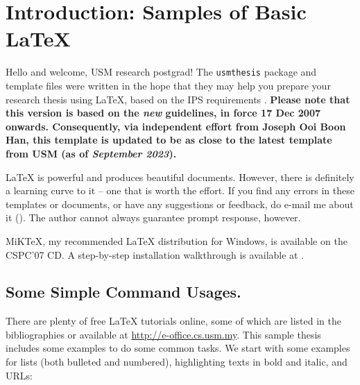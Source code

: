 \chapter{Introduction: Samples of Basic \LaTeX{}}\label{chap:intro}

Hello and welcome, \ac{USM} research postgrad!  The \verb|usmthesis| package and template files were written in the hope that they may help you prepare your research thesis using \LaTeX, based on the \ac{IPS} requirements \citep{ips:thesis:guideline:2007}. \textbf{Please note that this version is based on the \emph{new} guidelines, in force 17 Dec 2007 onwards. Consequently, via independent effort from Joseph Ooi Boon Han, this template is updated to be as close to the latest template from USM (as of \emph{September 2023}).}

\LaTeX{} is powerful and produces beautiful documents.  However, there is definitely a learning curve to it -- one that is worth the effort.  %
If you find any errors in these templates or documents, or have any suggestions or feedback, do e-mail me about it ().  The author cannot always guarantee prompt response, however. \Smiley

MiK\TeX{}, my recommended \LaTeX{} distribution for Windows, is available on the CSPC'07 CD. A step-by-step installation walkthrough is available at \citep{lim:latextypesetting}.

\section{Some Simple Command Usages.}

There are plenty of free \LaTeX{} tutorials online, some of which are listed in the bibliographies or available at \url{http://e-office.cs.usm.my}.  This sample thesis includes some examples to do some common tasks.  We start with some examples for lists (both bulleted and numbered), highlighting texts in bold and italic, and URLs:


